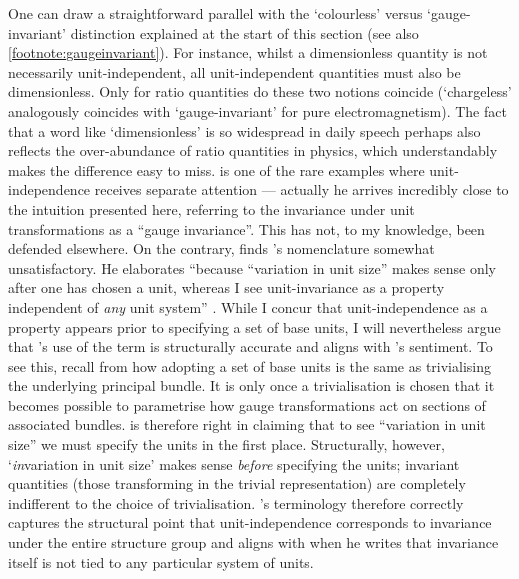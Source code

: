 \documentclass[12pt]{article}
\numberwithin{equation}{section}
\begin{document}
One can draw a straightforward parallel with the `colourless' versus `gauge-invariant' distinction explained at the start of this section (see also \cref{footnote:gaugeinvariant}). For instance, whilst a dimensionless quantity is not necessarily unit-independent, all unit-independent quantities must also be dimensionless. Only for ratio quantities do these two notions coincide (`chargeless' analogously coincides with `gauge-invariant' for pure electromagnetism). The fact that a word like `dimensionless' is so widespread in daily speech perhaps also reflects the over-abundance of ratio quantities in physics, which understandably makes the difference easy to miss. \citet{Roche1998} is one of the rare examples where unit-independence receives separate attention --- actually he arrives incredibly close to the intuition presented here, referring to the invariance under unit transformations as a ``gauge invariance''. This has not, to my knowledge, been defended elsewhere. On the contrary, \citet{Grozier2020} finds \citeauthor{Roche1998}'s nomenclature somewhat unsatisfactory. He elaborates ``because ``variation in unit size'' makes sense only after one has chosen a unit, whereas I see unit-invariance as a property independent of \emph{any} unit system'' \citep[p.~10]{Grozier2020}. While I concur that unit-independence as a property appears prior to specifying a set of base units, I will nevertheless argue that \citeauthor{Roche1998}'s use of the term is structurally accurate and aligns with \citeauthor{Grozier2020}'s sentiment. To see this, recall from  how adopting a set of base units is the same as trivialising the underlying principal bundle. It is only once a trivialisation is chosen that it becomes possible to parametrise how gauge transformations act on sections of associated bundles. \citeauthor{Grozier2020} is therefore right in claiming that to see ``variation in unit size'' we must specify the units in the first place. Structurally, however, `\emph{in}variation in unit size' makes sense \emph{before} specifying the units; invariant quantities (those transforming in the trivial representation) are completely indifferent to the choice of trivialisation. \citeauthor{Roche1998}'s terminology therefore correctly captures the structural point that unit-independence corresponds to invariance under the entire structure group and aligns with \citeauthor{Grozier2020} when he writes that invariance itself is not tied to any particular system of units.
\end{document}
